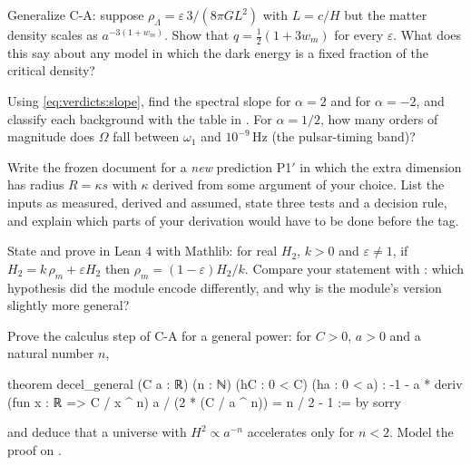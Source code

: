 \begin{exercise}[$\star\star$]
Generalize C-A: suppose $\rho_\Lambda=\varepsilon\,3/(8\pi G L^2)$ with $L=c/H$ but the matter
density scales as $a^{-3(1+w_m)}$. Show that $q=\tfrac12(1+3w_m)$ for every $\varepsilon$. What does
this say about any model in which the dark energy is a fixed fraction of the critical density?
\end{exercise}

\begin{exercise}[$\star\star$]
Using \eqref{eq:verdicts:slope}, find the spectral slope for $\alpha=2$ and for $\alpha=-2$, and
classify each background with the table in . For $\alpha=1/2$,
how many orders of magnitude does $\Omega$ fall between $\omega_1$ and $10^{-9}$\,Hz (the
pulsar-timing band)?
\end{exercise}

\begin{exercise}[$\star\star$]
Write the frozen document for a \emph{new} prediction P1$'$ in which the extra dimension has
radius $R=\kappa s$ with $\kappa$ derived from some argument of your choice. List the inputs as
measured, derived and assumed, state three tests and a decision rule, and explain which
parts of your derivation would have to be done before the tag.
\end{exercise}

\begin{exercise}
State and prove in Lean 4 with Mathlib: for real $H_2$, $k>0$ and $\varepsilon\ne1$, if
$H_2=k\,\rho_m+\varepsilon H_2$ then $\rho_m=(1-\varepsilon)H_2/k$. Compare your statement with
: which hypothesis did the module encode differently, and why is the
module's version slightly more general?
\end{exercise}

\begin{exercise}
Prove the calculus step of C-A for a general power: for $C>0$, $a>0$ and a natural number $n$,
\begin{leancode}
theorem decel_general (C a : ℝ) (n : ℕ) (hC : 0 < C) (ha : 0 < a) :
    -1 - a * deriv (fun x : ℝ => C / x ^ n) a / (2 * (C / a ^ n))
      = n / 2 - 1 := by sorry
\end{leancode}
and deduce that a universe with $H^2\propto a^{-n}$ accelerates only for $n<2$. Model the proof on
.
\end{exercise}

